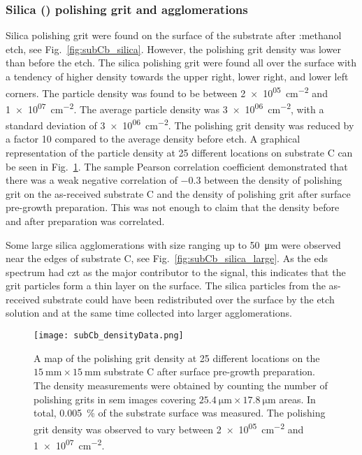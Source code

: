 \subsubsection{Silica () polishing grit and agglomerations}

Silica polishing grit were found on the surface of the substrate after :methanol etch, see Fig.~\ref{fig:subCb_silica}. However, the polishing grit density was lower than before the etch. The silica polishing grit were found all over the surface with a tendency of higher density towards the upper right, lower right, and lower left corners. The particle density was found to be between \SI{2e+05}{\centi\metre^{-2}} and \SI{1e+07}{\centi\metre^{-2}}. The average particle density was \SI{3e+06}{\centi\metre^{-2}}, with a standard deviation of \SI{3e+06}{\centi\metre^{-2}}. The polishing grit density was reduced by a factor 10 compared to the average density before etch. A graphical representation of the particle density at 25 different locations on substrate C can be seen in Fig.~\ref{fig:subCb_densityData}. The sample Pearson correlation coefficient demonstrated that there was a weak negative correlation of \SI{-0.3}{} between the density of polishing grit on the as-received substrate C and the density of polishing grit after surface pre-growth preparation. This was not enough to claim that the density before and after preparation was correlated.

Some large silica agglomerations with size ranging up to \SI{50}{\micro\metre} were observed near the edges of substrate C, see Fig.~\ref{fig:subCb_silica_large}. As the \ac{eds} spectrum had \ac{czt} as the major contributor to the signal, this indicates that the grit particles form a thin layer on the surface. The silica particles from the as-received substrate could have been redistributed over the surface by the etch solution and at the same time collected into larger agglomerations.

\begin{figure}[htbp]
    \centering
    \texttt{[image: subCb\_densityData.png]}
    \caption[Map of the polishing grit density on substrate C after surface pre-growth preparation.]{A map of the polishing grit density at 25 different locations on the $\SI{15}{\milli\metre}\times\SI{15}{\milli\metre}$ substrate C after surface pre-growth preparation. The density measurements were obtained by counting the number of polishing grits in \ac{sem} images covering $\SI{25.4}{\micro\metre}\times\SI{17.8}{\micro\metre}$ areas. In total, \SI{0.005}{\percent} of the substrate surface was measured. The polishing grit density was observed to vary between \SI{2e+05}{\centi\metre^{-2}} and \SI{1e+07}{\centi\metre^{-2}}.}
    \label{fig:subCb_densityData}
\end{figure}


